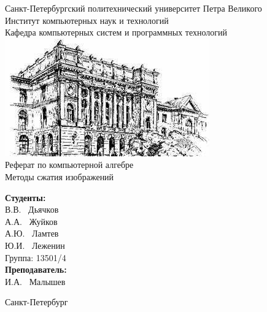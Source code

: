 \begin{titlepage}	%

	\begin{center}		%

		\large Санкт-Петербургский политехнический университет Петра Великого\\
		\large Институт компьютерных наук и технологий \\
		\large Кафедра компьютерных систем и программных технологий\\[1cm]
		
		\includegraphics[scale=0.7]{../pics/spbpu.jpg}\\[2cm]
		
		\huge Реферат по компьютерной алгебре\\[0.5cm] %
		\huge Методы сжатия изображений\\[3cm]

	\end{center}	
	
	\begin{flushright} %
		\begin{minipage}{0.25\textwidth} %
			\begin{flushleft} %

				\large\textbf{Студенты:}\\
				\large В.В. ~Дьячков\\
				\large А.А. ~Жуйков\\
				\large А.Ю. ~Ламтев\\
				\large Ю.И. ~Леженин\\
				\large {Группа:} 13501/4\\
				
				\large \textbf{Преподаватель:}\\
				\large И.А. ~Малышев\\

			\end{flushleft}
		\end{minipage}
	\end{flushright}
	
	\vfill %

	\begin{center}
	\large Санкт-Петербург\\
	\large \the\year %
	\end{center} %
\thispagestyle{empty} %
\end{titlepage} %

\vfill %
